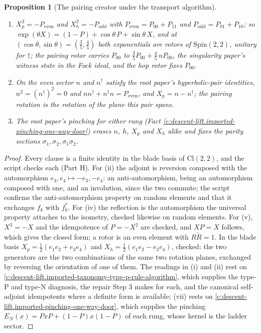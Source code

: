 \documentclass[11pt]{article}
\newtheorem{proposition}[theorem]{Proposition}
\theoremstyle{definition}
\theoremstyle{plain}
\providecommand{\Cl}{}\renewcommand{\Cl}{\mathrm{Cl}}
\providecommand{\EN}{}\renewcommand{\EN}{E_{N}}
\begin{document}
\begin{proposition}[The pairing creator under the transport algorithm]
\begin{enumerate}
\item[(v)] $X_{p}^{2} = -P_{\mathrm{even}}$ and $X_{h}^{2} = -P_{\mathrm{odd}}$ with $P_{\mathrm{even}} = P_{00} + P_{11}$ and $P_{\mathrm{odd}} = P_{01} + P_{10}$; so $\exp(\theta X) = (1 - P) + \cos\theta\,P + \sin\theta\,X$, and at $(\cos\theta, \sin\theta) = (\tfrac35, \tfrac45)$ both exponentials are rotors of $\mathrm{Spin}(2,2)$, unitary for $\dagger$; the pairing rotor carries $P_{00}$ to $\tfrac35 P_{00} + \tfrac45\,nP_{00}$, the singularity paper's witness state in the Fock ideal, and the hop rotor fixes $P_{00}$.
\item[(vi)] On the even sector $n$ and $n^{\dagger}$ satisfy the root paper's hyperbolic-pair identities, $n^{2} = (n^{\dagger})^{2} = 0$ and $nn^{\dagger} + n^{\dagger}n = P_{\mathrm{even}}$, and $X_{p} = n - n^{\dagger}$; the pairing rotation is the rotation of the plane this pair spans.
\item[(vii)] The root paper's pinching for either rung (Fact \ref{c:descent-lift.imported-pinching-one-way-door}) erases $n$, $h$, $X_{p}$ and $X_{h}$ alike and fixes the parity sections $\sigma_{1}, \sigma_{2}, \sigma_{1}\sigma_{2}$.
\end{enumerate}
\end{proposition}
\begin{proof}
Every clause is a finite identity in the blade basis of $\Cl(2,2)$, and the script checks each (Part H). For (ii) the adjoint is reversion composed with the automorphism $e_{3}, e_{4} \mapsto -e_{3}, -e_{4}$: an anti-automorphism, being an automorphism composed with one, and an involution, since the two commute; the script confirms the anti-automorphism property on random elements and that it exchanges $f_{k}$ with $f_{k}^{*}$. For (iv) the reflection is the automorphism the universal property attaches to the isometry, checked likewise on random elements. For (v), $X^{3} = -X$ and the idempotence of $P = -X^{2}$ are checked, and $XP = X$ follows, which gives the closed form; a rotor is an even element with $R\widetilde{R} = 1$. In the blade basis $X_{p} = \tfrac12(e_{1}e_{2} + e_{3}e_{4})$ and $X_{h} = \tfrac12(e_{1}e_{2} - e_{3}e_{4})$, checked: the two generators are the two combinations of the same two rotation planes, exchanged by reversing the orientation of one of them. The readings in (i) and (ii) rest on \ref{c:descent-lift.imported-taxonomy-type-p-rule-algorithm}, which supplies the type-P and type-N diagnosis, the repair Step 3 makes for each, and the canonical self-adjoint idempotents where a definite form is available; (vii) rests on \ref{c:descent-lift.imported-pinching-one-way-door}, which supplies the pinching $\EN(x) = PxP + (1-P)x(1-P)$ of each rung, whose kernel is the ladder sector.

\end{proof}
\end{document}
